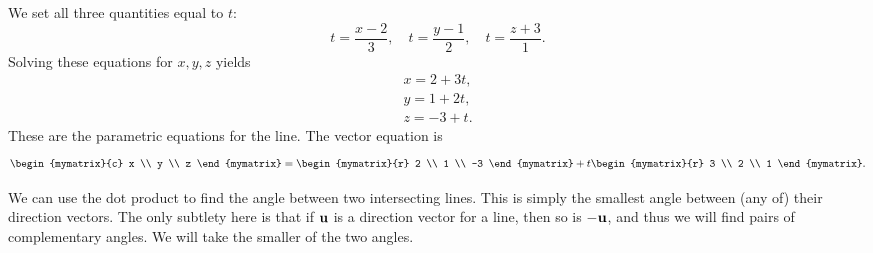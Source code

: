 \begin{solution}
  We set all three quantities equal to $t$:
  \begin{equation*}
    t=\frac{x-2}{3}, \quad
    t=\frac{y-1}{2}, \quad
    t=\frac{z+3}{1}.
  \end{equation*}
  Solving these equations for $x,y,z$ yields
  \begin{equation*}
    \begin{array}{c}
      x = 2 + 3t, \\
      y = 1 + 2t, \\
      z = -3 + t.
    \end{array}
  \end{equation*}
  These are the parametric equations for the line. The vector equation
  is
  \begin{equation*}
    \begin{mymatrix}{c}
      x \\
      y \\
      z
    \end{mymatrix} =
    \begin{mymatrix}{r}
      2 \\
      1 \\
      -3 
    \end{mymatrix}
    +
    t
    \begin{mymatrix}{r}
      3 \\
      2 \\
      1 
    \end{mymatrix}.
  \end{equation*}
\end{solution}

We can use the dot product to find the angle between two intersecting
lines. This is simply the smallest angle between (any of) their
direction vectors. The only subtlety here is that if $\mbox{\bf u}$ is a
direction vector for a line, then so is $-\mbox{\bf u}$, and thus we will
find pairs of complementary angles. We will take the smaller of the
two angles.
\begin{center} 
\end{center}

